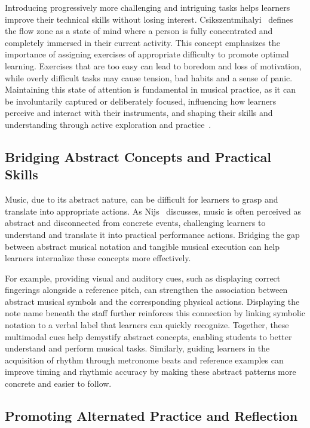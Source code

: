 \documentclass[runningheads]{llncs}
\begin{document}
Introducing progressively more challenging and intriguing tasks helps learners improve their technical skills without losing interest. Csikszentmihalyi~\cite{Csikszentmihalyi08} defines the flow zone as a state of mind where a person is fully concentrated and completely immersed in their current activity. This concept emphasizes the importance of assigning exercises of appropriate difficulty to promote optimal learning. Exercises that are too easy can lead to boredom and loss of motivation, while overly difficult tasks may cause tension, bad habits and a sense of panic. Maintaining this state of attention is fundamental in musical practice, as it can be involuntarily captured or deliberately focused, influencing how learners perceive and interact with their instruments, and shaping their skills and understanding through active exploration and practice~\cite{Tullberg22}.


\subsection{Bridging Abstract Concepts and Practical Skills}

Music, due to its abstract nature, can be difficult for learners to grasp and translate into appropriate actions. As Nijs~\cite{Nijs18} discusses, music is often perceived as abstract and disconnected from concrete events, challenging learners to understand and translate it into practical performance actions. Bridging the gap between abstract musical notation and tangible musical execution can help learners internalize these concepts more effectively.

For example, providing visual and auditory cues, such as displaying correct fingerings alongside a reference pitch, can strengthen the association between abstract musical symbols and the corresponding physical actions. Displaying the note name beneath the staff further reinforces this connection by linking symbolic notation to a verbal label that learners can quickly recognize.
Together, these multimodal cues help demystify abstract concepts, enabling students to better understand and perform musical tasks. Similarly, guiding learners in the acquisition of rhythm through metronome beats and reference examples can improve timing and rhythmic accuracy by making these abstract patterns more concrete and easier to follow.


\subsection{Promoting Alternated Practice and Reflection}
\end{document}
